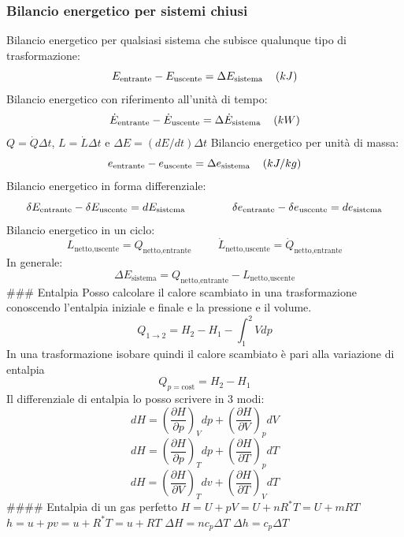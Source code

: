 \hypertarget{bilancio-energetico-per-sistemi-chiusi}{%
\subsubsection{Bilancio energetico per sistemi
chiusi}\label{bilancio-energetico-per-sistemi-chiusi}}

Bilancio energetico per qualsiasi sistema che subisce qualunque tipo di
trasformazione:
\[E_\text{entrante}-E_\text{uscente}=\Delta E_\text{sistema}\hspace{0.4cm}(kJ)\]
Bilancio energetico con riferimento all'unità di tempo:
\[\dot E_\text{entrante}-\dot E_\text{uscente}=\Delta \dot E_\text{sistema}\hspace{0.4cm}(kW)\]
\(Q=\dot Q\Delta t\), \(L=\dot L \Delta t\) e
\(\Delta E=(dE/dt)\Delta t\) Bilancio energetico per unità di massa:
\[e_\text{entrante}-e_\text{uscente}=\Delta e_\text{sistema}\hspace{0.4cm}(kJ/kg)\]
Bilancio energetico in forma differenziale:
\[\delta E_\text{entrante}-\delta E_\text{uscente}=dE_\text{sistema} \hspace{1.5cm} \delta e_\text{entrante}-\delta e_\text{uscente}=de_\text{sistema}\]
Bilancio energetico in un ciclo:
\[L_\text{netto,uscente}=Q_\text{netto,entrante}\hspace{1cm}\dot L_\text{netto,uscente}=\dot Q_\text{netto,entrante}\]
In generale:
\[\Delta E_\text{sistema}=Q_\text{netto,entrante}-L_\text{netto,uscente}\]
\#\#\# Entalpia Posso calcolare il calore scambiato in una
trasformazione conoscendo l'entalpia iniziale e finale e la pressione e
il volume. \[Q_{1\to2}=H_2-H_1-\int_1^2 Vdp\] In una trasformazione
isobare quindi il calore scambiato è pari alla variazione di entalpia
\[Q_{p=\text{cost}}=H_2-H_1\] Il differenziale di entalpia lo posso
scrivere in 3 modi:
\[dH=\left( \frac{\partial H}{\partial p} \right)_Vdp+\left( \frac{\partial H}{\partial V} \right)_pdV\]\[dH=\left( \frac{\partial H}{\partial p} \right)_Tdp+\left( \frac{\partial H}{\partial T} \right)_pdT\]\[dH=\left( \frac{\partial H}{\partial V} \right)_Tdv+\left( \frac{\partial H}{\partial T} \right)_VdT\]
\#\#\#\# Entalpia di un gas perfetto \(H=U+pV=U+nR^*T=U+mRT\)
\(h=u+pv=u+R^*T=u+RT\) \(\Delta H=nc_p\Delta T\)
\(\Delta h=c_p\Delta T\)
